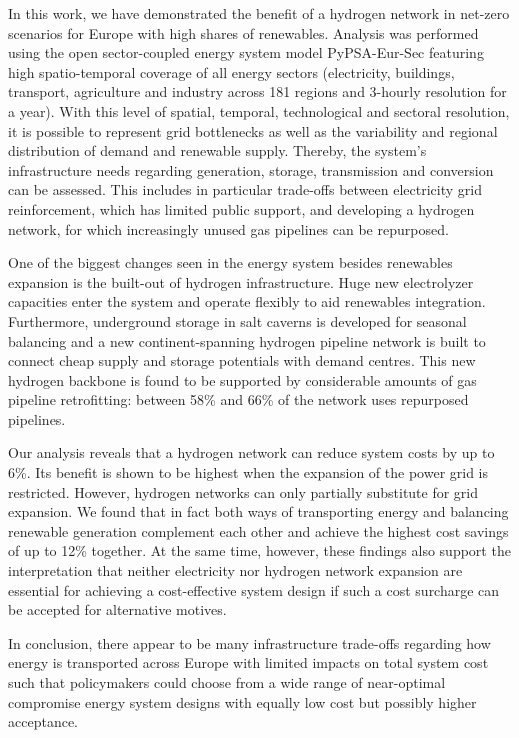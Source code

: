 In this work, we have demonstrated the benefit of a hydrogen network in net-zero
\co scenarios for Europe with high shares of renewables. Analysis was performed
using the open sector-coupled energy system model PyPSA-Eur-Sec featuring high
spatio-temporal coverage of all energy sectors (electricity, buildings,
transport, agriculture and industry across 181 regions and 3-hourly resolution
for a year). With this level of spatial, temporal, technological and sectoral
resolution, it is possible to represent grid bottlenecks as well as the
variability and regional distribution of demand and renewable supply. Thereby,
the system's infrastructure needs regarding generation, storage, transmission
and conversion can be assessed. This includes in particular trade-offs between
electricity grid reinforcement, which has limited public support, and developing
a hydrogen network, for which increasingly unused gas pipelines can be
repurposed.

One of the biggest changes seen in the energy system besides renewables
expansion is the built-out of hydrogen infrastructure. Huge new electrolyzer
capacities enter the system and operate flexibly to aid renewables integration.
Furthermore, underground storage in salt caverns is developed for seasonal
balancing and a new continent-spanning hydrogen pipeline network is built to
connect cheap supply and storage potentials with demand centres. This new
hydrogen backbone is found to be supported by considerable amounts of gas
pipeline retrofitting: between 58\% and 66\% of the network uses repurposed
pipelines.

Our analysis reveals that a hydrogen network can reduce system costs by up to
6\%. Its benefit is shown to be highest when the expansion of the power grid is
restricted. However, hydrogen networks can only partially substitute for grid
expansion. We found that in fact both ways of transporting energy and balancing
renewable generation complement each other and achieve the highest cost savings
of up to 12\% together. At the same time, however, these findings also support
the interpretation that neither electricity nor hydrogen network expansion are
essential for achieving a cost-effective system design if such a cost surcharge
can be accepted for alternative motives.

In conclusion, there appear to be many infrastructure trade-offs regarding how
energy is transported across Europe with limited impacts on total system cost
such that policymakers could choose from a wide range of near-optimal compromise
energy system designs with equally low cost but possibly higher acceptance.


